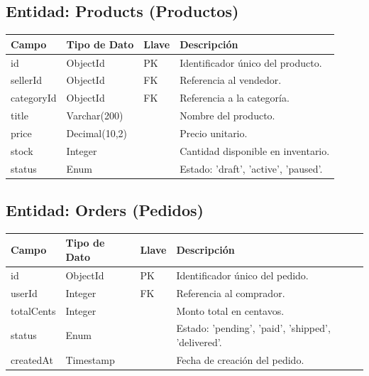 \documentclass{article}
\begin{document}
\subsection*{Entidad: Products (Productos)}
\begin{longtable}{|p{3cm}|p{3cm}|p{1.5cm}|p{6cm}|}
\hline
\rowcolor{headergray} \textbf{Campo} & \textbf{Tipo de Dato} & \textbf{Llave} & \textbf{Descripción} \\ \hline
id & ObjectId & PK & Identificador único del producto. \\ \hline
sellerId & ObjectId & FK & Referencia al vendedor. \\ \hline
categoryId & ObjectId & FK & Referencia a la categoría. \\ \hline
title & Varchar(200) & & Nombre del producto. \\ \hline
price & Decimal(10,2) & & Precio unitario. \\ \hline
stock & Integer & & Cantidad disponible en inventario. \\ \hline
status & Enum & & Estado: 'draft', 'active', 'paused'. \\ \hline
\end{longtable}

\subsection*{Entidad: Orders (Pedidos)}
\begin{longtable}{|p{3cm}|p{3cm}|p{1.5cm}|p{6cm}|}
\hline
\rowcolor{headergray} \textbf{Campo} & \textbf{Tipo de Dato} & \textbf{Llave} & \textbf{Descripción} \\ \hline
id & ObjectId & PK & Identificador único del pedido. \\ \hline
userId & Integer & FK & Referencia al comprador. \\ \hline
totalCents & Integer & & Monto total en centavos. \\ \hline
status & Enum & & Estado: 'pending', 'paid', 'shipped', 'delivered'. \\ \hline
createdAt & Timestamp & & Fecha de creación del pedido. \\ \hline
\end{longtable}
\end{document}
